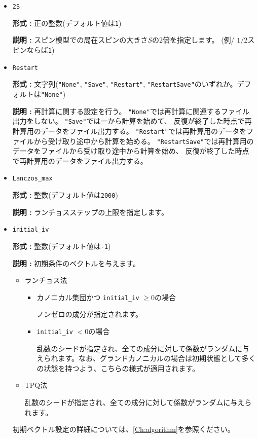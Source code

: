 \begin{itemize}
\item \verb|2S|

{\bf 形式 :} 正の整数(デフォルト値は\verb|1|)

{\bf 説明 :} スピン模型での局在スピンの大きさ$S$の2倍を指定します。
(例/ $1/2$スピンならば\verb|1|)

\item \verb|Restart|

  {\bf 形式 :} 文字列(\verb|"None"|, \verb|"Save"|, \verb|"Restart"|,  
  \verb|"RestartSave"|のいずれか。デフォルトは\verb|"None"|)

  {\bf 説明 :} 再計算に関する設定を行う。
  \verb|"None"|では再計算に関連するファイル出力をしない。
  \verb|"Save"|では一から計算を始めて、
  反復が終了した時点で再計算用のデータをファイル出力する。
  \verb|"Restart"|では再計算用のデータをファイルから受け取り途中から計算を始める。
  \verb|"RestartSave"|では再計算用のデータをファイルから受け取り途中から計算を始め、
  反復が終了した時点で再計算用のデータをファイル出力する。

\item \verb|Lanczos_max|

{\bf 形式 :} 整数(デフォルト値は\verb|2000|)

{\bf 説明 :} ランチョスステップの上限を指定します。

\item \verb|initial_iv|

{\bf 形式 :} 整数(デフォルト値は\verb|-1|)

{\bf 説明 :}  {初期条件のベクトルを与えます。}
\begin{itemize}
\item{ランチョス法}
\begin{itemize}
\item{カノニカル集団かつ \verb|initial_iv| $\geq 0$の場合}

ノンゼロの成分が指定されます。

\item{ \verb|initial_iv| $< 0$の場合}

乱数のシードが指定され、全ての成分に対して係数がランダムに与えられます。なお、グランドカノニカルの場合は初期状態として多くの状態を持つよう、こちらの様式が適用されます。
\end{itemize}

\item{TPQ法}

乱数のシードが指定され、全ての成分に対して係数がランダムに与えられます。
\end{itemize}
初期ベクトル設定の詳細については、\ref{Ch:algorithm}を参照ください。


\end{itemize}
